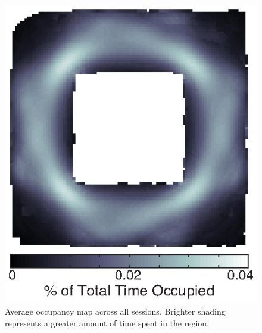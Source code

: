 \begin{figure}[bh]
\centering
\includegraphics[width=.6\textwidth]{./tex/linearGrids/figs/supp_occupancy}
\caption[Average occupancy map]{Average occupancy map across all sessions. Brighter shading represents a greater amount of time spent in the region.}
\label{fig:subOcc}
\end{figure}

